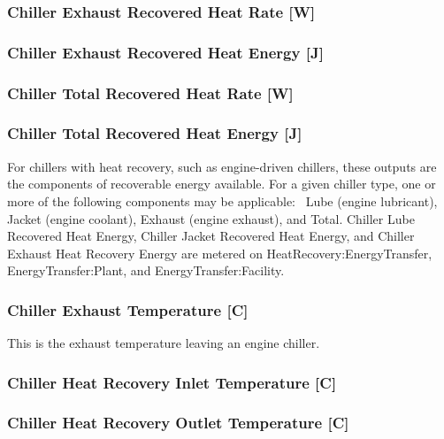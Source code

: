 \subsubsection{Chiller Exhaust Recovered Heat Rate {[}W{]}}\label{chiller-exhaust-recovered-heat-rate-w}

\subsubsection{Chiller Exhaust Recovered Heat Energy {[}J{]}}\label{chiller-exhaust-recovered-heat-energy-j}

\subsubsection{Chiller Total Recovered Heat Rate {[}W{]}}\label{chiller-total-recovered-heat-rate-w}

\subsubsection{Chiller Total Recovered Heat Energy {[}J{]}}\label{chiller-total-recovered-heat-energy-j}

For chillers with heat recovery, such as engine-driven chillers, these outputs are the components of recoverable energy available. For a given chiller type, one or more of the following components may be applicable:~ Lube (engine lubricant), Jacket (engine coolant), Exhaust (engine exhaust), and Total. Chiller Lube Recovered Heat Energy, Chiller Jacket Recovered Heat Energy, and Chiller Exhaust Heat Recovery Energy are metered on HeatRecovery:EnergyTransfer, EnergyTransfer:Plant, and EnergyTransfer:Facility.

\subsubsection{Chiller Exhaust Temperature {[}C{]}}\label{chiller-exhaust-temperature-c}

This is the exhaust temperature leaving an engine chiller.

\subsubsection{Chiller Heat Recovery Inlet Temperature {[}C{]}}\label{chiller-heat-recovery-inlet-temperature-c}

\subsubsection{Chiller Heat Recovery Outlet Temperature {[}C{]}}\label{chiller-heat-recovery-outlet-temperature-c}

